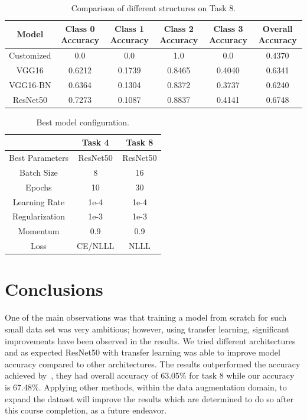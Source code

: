 \documentclass[10pt,twocolumn,letterpaper]{article}
\begin{document}
\begin{table}
\begin{center}
\begin{tabular}{|c|c|c|c|c|c|}
\hline
Model & Class 0 Accuracy & Class 1 Accuracy & Class 2 Accuracy &  Class 3 Accuracy & Overall Accuracy \\
\hline\hline
Customized &  0.0 & 0.0 & 1.0 & 0.0 & 0.4370 \\
\hline
VGG16 & 0.6212 & 0.1739 & 0.8465 & 0.4040 & 0.6341 \\
\hline
VGG16-BN & 0.6364 & 0.1304 & 0.8372 & 0.3737 & 0.6240 \\
\hline
ResNet50 & 0.7273 & 0.1087 & 0.8837 & 0.4141 & 0.6748 \\
\hline
\end{tabular}
\end{center}
\caption{Comparison of different structures on Task 8.}
\label{tab:Task8Result}
\end{table}

\begin{table}
\begin{center}
\begin{tabular}{|c|c|c|}
\hline
 & Task 4 & Task 8 \\
\hline
Best Parameters & ResNet50 &  ResNet50 \\
\hline\hline
Batch Size & 8 & 16 \\
\hline
Epochs & 10 & 30 \\
\hline
Learning Rate  & 1e-4 & 1e-4 \\
\hline
Regularization  & 1e-3 & 1e-3 \\
\hline
Momentum  & 0.9 & 0.9 \\
\hline
Loss  & CE/NLLL & NLLL \\
\hline
\end{tabular}
\end{center}
\caption{Best model configuration.}
\label{tab:hyperparam}
\end{table}

\section{Conclusions}
One of the main observations was that training a model from scratch for such small data set was very ambitious; however, using transfer learning, significant improvements have been observed in the results. We tried different architectures and as expected ResNet50 with transfer learning was able to improve model accuracy compared to other architectures. The results outperformed the accuracy achieved by~\cite{Gao01}, they had overall accuracy of 63.05$\%$ for task 8 while our accuracy is 67.48$\%$. Applying other methods, within the data augmentation domain, to expand the dataset will improve the results which are determined to do so after this course completion, as a future endeavor.   
\end{document}
